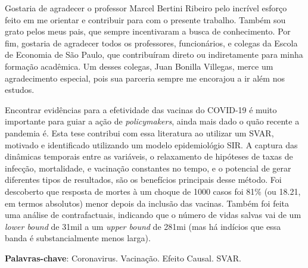 \documentclass[
	12pt,				%
	oneside,			%
	a4paper,			%
	english,			%
	brazil				%
	hyperref = {colorlinks, citecolor=c1d, linkcolor=c2d, urlcolor=c3d, colorlinks}
	]{abntex2}
\newcounter{j}
\begin{document}
\begin{resumo}[Agradecimentos]
Gostaria de agradecer o professor Marcel Bertini Ribeiro pelo incrível esforço feito em me orientar e contribuir para com o presente trabalho. Também sou grato pelos meus pais, que sempre incentivaram a busca de conhecimento. Por fim, gostaria de agradecer todos os professores, funcionários, e colegas da Escola de Economia de São Paulo, que contribuíram direto ou indiretamente para minha formação acadêmica. Um desses colegas, Juan Bonilla Villegas, merce um agradecimento especial, pois sua parceria sempre me encorajou a ir além nos estudos.
\end{resumo}

\setlength{\absparsep}{18pt} %
\begin{resumo}
   Encontrar evidências para a efetividade das vacinas do COVID-19 é muito importante para guiar a ação de \textit{policymakers}, ainda mais dado o quão recente a pandemia é. Esta tese contribui com essa literatura ao utilizar um SVAR, motivado e identificado utilizando um modelo epidemiológio SIR. A captura das dinâmicas temporais entre as variáveis, o relaxamento de hipóteses de taxas de infecção, mortalidade, e vacinação constantes no tempo, e o potencial de gerar diferentes tipos de resultados, são os benefícios principais desse método. Foi descoberto que resposta de mortes à um choque de 1000 casos foi 81\% (ou 18.21, em termos absolutos) menor depois da inclusão das vacinas. Também foi feita uma análise de contrafactuais, indicando que o número de vidas salvas vai de um \textit{lower bound} de 31mil a um \textit{upper bound} de 281mi (mas há indícios que essa banda é substancialmente menos larga).
   \vspace{\onelineskip}
 
   \noindent
   \textbf{Palavras-chave}: Coronavirus. Vacinação. Efeito Causal. SVAR.
\end{resumo}
\end{document}
